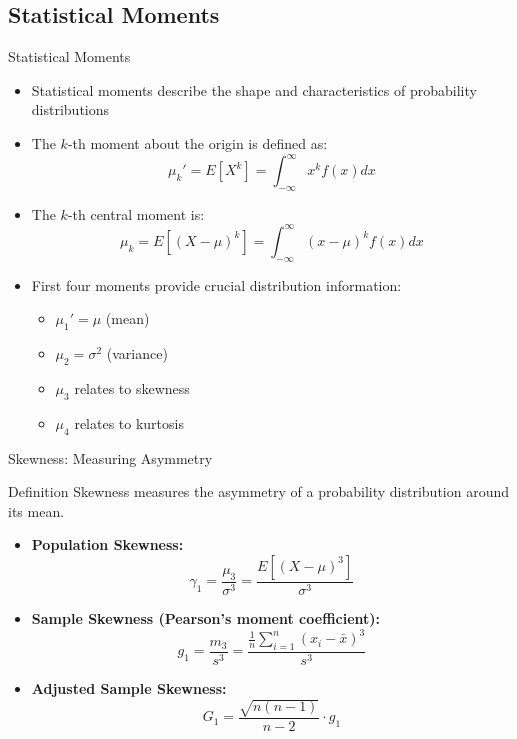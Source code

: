 \documentclass[aspectratio=169,xcolor=dvipsnames,svgnames,x11names,fleqn]{beamer}
\begin{document}
    \subsection{Statistical Moments}

        
    \begin{frame}
    \subsectionpage
    \end{frame}

    \begin{frame}{Statistical Moments}
        \footnotesize

\begin{itemize}
    \item Statistical moments describe the shape and characteristics of probability distributions
    \item The $k$-th moment about the origin is defined as:
    $$\mu_k' = E[X^k] = \int_{-\infty}^{\infty} x^k f(x) dx$$
    \item The $k$-th central moment is:
    $$\mu_k = E[(X - \mu)^k] = \int_{-\infty}^{\infty} (x - \mu)^k f(x) dx$$
    \item First four moments provide crucial distribution information:
    \begin{itemize}
        \item $\mu_1' = \mu$ (mean)
        \item $\mu_2 = \sigma^2$ (variance)
        \item $\mu_3$ relates to skewness
        \item $\mu_4$ relates to kurtosis
    \end{itemize}
\end{itemize}
\end{frame}

\begin{frame}{Skewness: Measuring Asymmetry}
\begin{block}{Definition}
Skewness measures the asymmetry of a probability distribution around its mean.
\end{block}

\begin{itemize}
    \item \textbf{Population Skewness:}
    $$\gamma_1 = \frac{\mu_3}{\sigma^3} = \frac{E[(X - \mu)^3]}{\sigma^3}$$
    
    \item \textbf{Sample Skewness (Pearson's moment coefficient):}
    $$g_1 = \frac{m_3}{s^3} = \frac{\frac{1}{n}\sum_{i=1}^{n}(x_i - \bar{x})^3}{s^3}$$
    
    \item \textbf{Adjusted Sample Skewness:}
    $$G_1 = \frac{\sqrt{n(n-1)}}{n-2} \cdot g_1$$
\end{itemize}
\end{frame}
\end{document}
